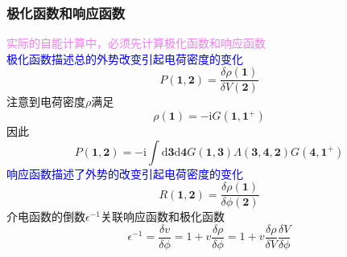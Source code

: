 \documentclass[cjk,slidestop,compress,mathserif,blue]{beamer}
\begin{document}
\frame
{
	\frametitle{极化函数和响应函数}
	\textcolor{violet}{实际的自能计算中，必须先计算极化函数和响应函数}\\
	\textcolor{blue}{极化函数描述总的外势改变引起电荷密度的变化}
	\begin{displaymath}
		P(\mathbf{1},\mathbf{2})=\frac{\delta\rho(\mathbf{1})}{\delta V(\mathbf{2})}
	\end{displaymath}
	注意到电荷密度$\rho$满足
	\begin{displaymath}
		\rho(\mathbf{1})=-\mathrm{i}G(\mathbf{1},\mathbf{1}^{+})
	\end{displaymath}
	因此
	\begin{displaymath}
		P(\mathbf{1},\mathbf{2})=-\mathrm{i}\int\mathrm{d}\mathbf{3}\mathrm{d}\mathbf{4}G(\mathbf{1},\mathbf{3})\Lambda(\mathbf{3},\mathbf{4},\mathbf{2})G(\mathbf{4},\mathbf{1}^{+})
	\end{displaymath}
	\textcolor{blue}{响应函数描述了外势的改变引起电荷密度的变化}
	\begin{displaymath}
		R(\mathbf{1},\mathbf{2})=\frac{\delta\rho(\mathbf{1})}{\delta\phi(\mathbf{2})}
	\end{displaymath}
	介电函数的倒数$\epsilon^{-1}$关联响应函数和极化函数
	\vskip -10pt
	\begin{displaymath}
		\epsilon^{-1}=\frac{\delta v}{\delta\phi}=1+v\frac{\delta\rho}{\delta\phi}=1+v\frac{\delta\rho}{\delta V}\frac{\delta V}{\delta\phi}
	\end{displaymath}
}
\end{document}
